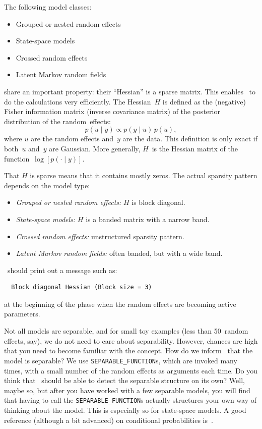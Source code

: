 \documentclass{admbmanual}
\newcommand{\citeasnoun}{\cite}
\begin{document}
The following model classes:
\begin{itemize}
  \item Grouped or nested random effects
  \item State-space models
  \item Crossed random effects
   \item Latent Markov random fields
\end{itemize}
share an important property: their ``Hessian'' is a sparse matrix. This enables
\scAR\ to do the calculations very efficiently. The Hessian~$H$ is defined
as the (negative) Fisher information matrix (inverse covariance matrix) of the posterior distribution of the random~effects:
\begin{equation}
  p(u \mid y) \propto p(y \mid u)\, p(u),
  \label{p(u|y)}
\end{equation}
where $u$ are the random effects and~$y$ are the data. This definition is only exact if both~$u$ and~$y$ are
Gaussian. More generally, $H$~is the Hessian matrix of the function~$\log\left[p(\cdot  \mid y)\right]$.

That $H$ is sparse means that it contains mostly zeros. The actual sparsity pattern depends on the model type:
\begin{itemize}
  \item \textit{Grouped or nested random effects:} $H$ is block diagonal.
   \item \textit{State-space models:} $H$ is a banded matrix with a narrow band.
   \item \textit{Crossed random effects:} unstructured sparsity pattern.
   \item \textit{Latent Markov random fields:} often banded, but with a wide band.
\end{itemize}
\scAR\ should print out a message such as:
\begin{lstlisting}
  Block diagonal Hessian (Block size = 3)
\end{lstlisting}
at the beginning of the phase when the random effects are becoming active parameters. 

Not all models are separable, and for small toy examples (less than 50~random effects, say),
we do not need to care about separability. However, chances are high that you need to become
familiar with the concept. How do we inform \scAR\ that the model is separable?
We use \texttt{SEPARABLE\_FUNCTION}s,  which are invoked
many times, with a small number of the random effects as arguments each time.
Do you think that \scAR\ should be able to detect the separable structure
on its own? Well, maybe so, but after you have worked with a few separable
models, you will find that having to call the \texttt{SEPARABLE\_FUNCTION}s
actually structures your own way of thinking about the model. This is especially
so for state-space models. A good reference (although a bit advanced) on conditional probabilities is~\citeasnoun{rue2005gaussian}.
\end{document}
